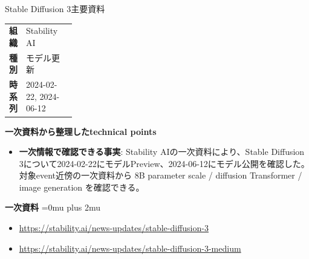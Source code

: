 \begin{technicalnote}{Stable Diffusion 3}{主要資料}
\begingroup
\begin{tabularx}{\linewidth}{@{}>{\bfseries}p{0.22\linewidth}X@{}}
組織 & Stability AI \\
種別 & モデル更新 \\
時系列 & 2024-02-22, 2024-06-12 \\
\end{tabularx}
\smallskip
\begin{minipage}{\linewidth}
{\bfseries 一次資料から整理したtechnical points}
\begin{itemize}[leftmargin=1.5em,itemsep=0.35em]
\item \textbf{一次情報で確認できる事実}: Stability AIの一次資料により、Stable Diffusion 3について2024-02-22にモデルPreview、2024-06-12にモデル公開を確認した。 対象event近傍の一次資料から 8B parameter scale / diffusion Transformer / image generation を確認できる。
\end{itemize}
\begin{minipage}{\linewidth}
\begin{samepage}
{\bfseries 一次資料}
\begingroup\sloppy
\Urlmuskip=0mu plus 2mu\relax
\begin{itemize}[leftmargin=1.5em,itemsep=0.25em]
\item {\scriptsize\url{https://stability.ai/news-updates/stable-diffusion-3}}
\item {\scriptsize\url{https://stability.ai/news-updates/stable-diffusion-3-medium}}
\end{itemize}
\endgroup
\end{samepage}
\end{minipage}
\end{minipage}
\endgroup
\end{technicalnote}
\medskip

